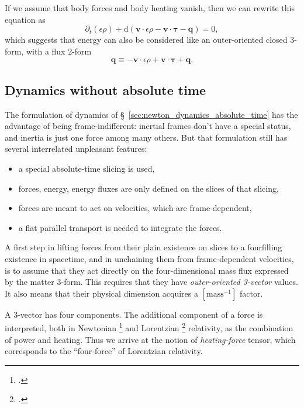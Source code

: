 \documentclass[\ifafour a4paper,12pt,\else a5paper,10pt,\fi%
onecolumn,oneside,article,%
british%
]{memoir}
\theoremstyle{remark}
\theoremstyle{innote}
\newcommand*{\citep}{\footcites}%
\newcommand*{\de}{\partialup}%
\newcommand*{\di}{\mathrm{d}}%
\renewcommand*{\|}{\nonscript\,\vert\nonscript\;\mathopen{}}
\newcommand*{\sect}{\S}%
\newcommand*{\sects}{\S\S}%
\newcommand*{\ydd}{\rho}
\newcommand*{\yd}{\ydd}
\newcommand*{\yqq}{q}
\newcommand*{\yq}{\bm{\yqq}}
\newcommand*{\yTT}{\tau}
\newcommand*{\yT}{\bm{\yTT}}
\newcommand*{\yvvt}{v}
\newcommand*{\yvt}{\bm{\yvvt}}
\newcommand*{\ypp}{q}
\newcommand*{\yp}{\bm{\ypp}}
\newcommand*{\ye}{\epsilon}
\begin{document}
If we assume that body forces and body heating vanish, then we can rewrite
this equation as
\begin{equation}
  \label{eq:balance_energy_suggests_3form}
  \de_t(\ye\yd) + \di(\yvt \cdot \ye\yd -\yvt\cdot\yT - \yq) = 0,
\end{equation}
which suggests that energy can also be considered like an outer-oriented
closed 3-form, with a flux 2-form
\begin{equation}
  \label{eq:energy_4velocity}
  \yp \equiv -\yvt \cdot\ye\yd + \yvt\cdot\yT +\yq.
\end{equation}




\subsection{Dynamics without absolute time}
\label{sec:newton_dynamics_without_absolute_time}

The formulation of dynamics of
\sect~\ref{sec:newton_dynamics_absolute_time} has the advantage of being
frame-indifferent: inertial frames don't have a special status, and inertia
is just one force among many others. But that formulation still has several
interrelated unpleasant features:
\begin{itemize}
\item a special absolute-time slicing is used,
\item forces, energy, energy fluxes are only defined on the slices of that
  slicing,
\item forces are meant to act on velocities, which are frame-dependent,
\item a flat parallel transport is needed to integrate the forces.
\end{itemize}

A first step in lifting forces from their plain existence on slices to a
fourfilling existence in spacetime, and in unchaining them from
frame-dependent velocities, is to assume that they act directly on the
four-dimensional mass flux expressed by the matter 3-form. This requires
that they have \emph{outer-oriented 3-vector} values. It also means that
their physical dimension acquires a $[\text{mass}^{-1}]$ factor.

A 3-vector has four components. The additional component of a force is
interpreted, both in Newtonian \citep[\sects~152--154,
288--289]{truesdelletal1960}[\sect~2.3]{grotetal1966} and Lorentzian
\citep{eckart1940c}[\sect~2.3]{grotetal1966}{maugin1978b} relativity, as
the combination of power and heating. Thus we arrive at the notion of
\emph{heating-force} tensor, which corresponds to the \enquote{four-force}
of Lorentzian relativity.
\end{document}
